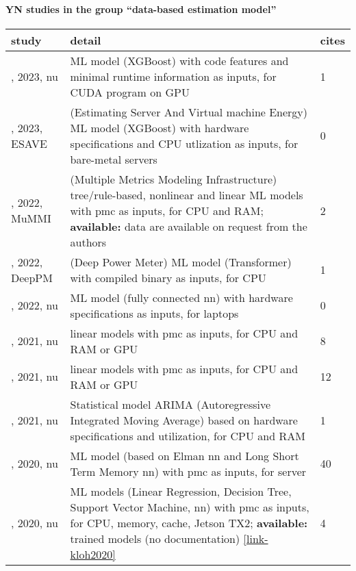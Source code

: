\paragraph{YN studies in the group ``data-based estimation model''} 
 \label{tab:YN-data-based-estimation-model} 
\begin{longtable}{|>{\raggedright\arraybackslash}p{2.75cm}|p{11.75cm}|p{0.7cm}|}
\toprule
\bfseries study & \bfseries detail & \bfseries cites \\
\midrule 
\endhead
\cite{alavani2023}, 2023, \acrshort{nu} & ML model (XGBoost) with code features and minimal runtime information as inputs, for CUDA program on GPU & 1 \\
\cite{pathania2023}, 2023, ESAVE &  (Estimating Server And Virtual machine Energy) ML model (XGBoost) with hardware specifications and CPU utlization as inputs, for bare-metal servers & 0 \\
\cite{wu2022}, 2022, MuMMI &  (Multiple Metrics Modeling Infrastructure) tree/rule-based, nonlinear and linear ML models with \acrshort{pmc} as inputs, for CPU and RAM; \textbf{available:} data are available on request from the authors & 2 \\
\cite{shim2022}, 2022, DeepPM &  (Deep Power Meter) ML model (Transformer) with compiled binary as inputs, for CPU & 1 \\
\cite{morlans2022}, 2022, \acrshort{nu} & ML model (fully connected \acrshort{nn}) with hardware specifications as inputs, for laptops & 0 \\
\cite{shahid2021b}, 2021, \acrshort{nu} & linear models with \acrshort{pmc} as inputs, for CPU and RAM or GPU & 8 \\
\cite{shahid2021a}, 2021, \acrshort{nu} & linear models with \acrshort{pmc} as inputs, for CPU and RAM or GPU & 12 \\
\cite{aboubakar2021}, 2021, \acrshort{nu} & Statistical model ARIMA (Autoregressive Integrated Moving Average) based on hardware specifications and utilization, for CPU and RAM & 1 \\
\cite{lin2020}, 2020, \acrshort{nu} & ML model (based on Elman \acrshort{nn} and Long Short Term Memory \acrshort{nn}) with \acrshort{pmc} as inputs, for server & 40 \\
\cite{kloh2020}, 2020, \acrshort{nu} & ML models (Linear Regression, Decision Tree, Support Vector Machine, \acrshort{nn}) with \acrshort{pmc} as inputs, for CPU, memory, cache, Jetson TX2; \textbf{available:} trained models (no documentation) \href{https://github.com/ViniciusPrataKloh/dissertacao-mestrado}{\ref*{link-kloh2020}} & 4 \\

\end{longtable}
